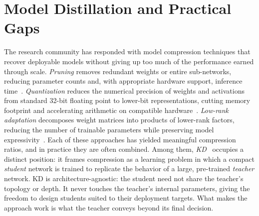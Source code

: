 \section{Model Distillation and Practical Gaps} \label{sec:12-introduction-model}
\begin{foldable}
  The research community has responded with model compression techniques that recover deployable models without giving up too much of the performance earned through scale.
  \textit{Pruning} removes redundant weights or entire sub-networks, reducing parameter counts and, with appropriate hardware support, inference time~\cite{han2015learning,molchanov2016pruning}.
  \textit{Quantization} reduces the numerical precision of weights and activations from standard 32-bit floating point to lower-bit representations, cutting memory footprint and accelerating arithmetic on compatible hardware~\cite{hubara2018quantized,jacob2018quantization}.
  \textit{Low-rank adaptation} decomposes weight matrices into products of lower-rank factors, reducing the number of trainable parameters while preserving model expressivity~\cite{hu2022lora}.
  Each of these approaches has yielded meaningful compression ratios, and in practice they are often combined.
  Among them, \textit{\acl{KD}}~\cite{hinton2015distilling} occupies a distinct position: it frames compression as a learning problem in which a compact \textit{student} network is trained to replicate the behavior of a large, pre-trained \textit{teacher} network.
  \ac{KD} is architecture-agnostic: the student need not share the teacher's topology or depth.
  It never touches the teacher's internal parameters, giving the freedom to design students suited to their deployment targets.
  What makes the approach work is what the teacher conveys beyond its final decision.
\end{foldable}

